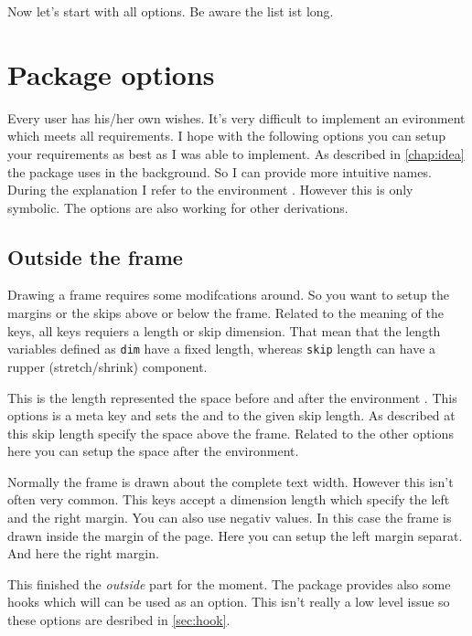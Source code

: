 \documentclass[openany,12pt,tocdepth=3,showframe]{ltx-md}
\begin{document}
\vspace*{\baselineskip}
Now let's start with all options. Be aware the list ist long. 


\chapter{Package options}\label{chap:options}
Every user has his/her own wishes. It's very difficult to implement an evironment 
which meets all requirements. I hope with the following options you can setup your 
requirements as best as I was able to implement. As described in \autoref{chap:idea}
the package uses  in the background. So I can provide more intuitive names.
During the explanation I refer to the environment . However this is only
symbolic. The options are also working for other derivations. 

\section{Outside the frame}
Drawing a frame requires some modifcations around. So you want to setup the margins
or the skips above or below the frame. Related to the meaning of the keys, all keys 
requiers a length or skip dimension. That mean that the length variables defined as
\texttt{dim} have a fixed length, whereas \texttt{skip} length can have a rupper (stretch/shrink) component. 

This is the length represented the space before and after the environment .  
This options is a meta key and sets the  and  to the given skip length. 
As described at  this skip length specify the space above the frame.
Related to the other options here you can setup the space after the environment.


Normally the frame  is drawn about the complete text width. However this isn't
often very common. This keys accept a dimension length which specify the left and the right margin.
You can also use negativ values. In this case the frame is drawn inside the margin of the page.
Here you can setup the left margin separat. 
And here the right margin. 

\vspace*{\baselineskip}
This finished the \emph{outside} part for the moment. The package provides also some hooks
which will can be used as an option. This isn't really a low level issue so these
options are desribed in \autoref{sec:hook}. 
\end{document}
